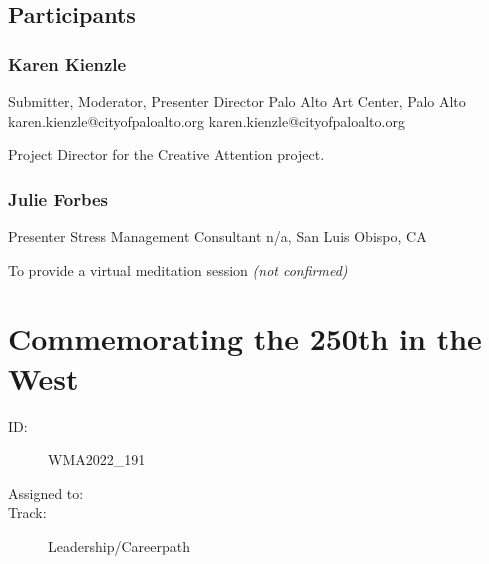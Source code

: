 \documentclass{report}
\begin{document}
            \subsection*{Participants}
              \subsubsection*{ Karen Kienzle }
              Submitter, Moderator, Presenter\newline
              Director\newline
              Palo Alto Art Center, Palo Alto
              \newline
              karen.kienzle@cityofpaloalto.org\newline
              karen.kienzle@cityofpaloalto.org\newline

              Project Director for the Creative Attention project.\newline


              

              
                \subsubsection*{ Julie  Forbes }
                Presenter\newline
                Stress Management Consultant\newline
                n/a, San Luis Obispo, CA
                \newline
                
                
                

                To provide a virtual meditation session
                \emph{ (not confirmed) }
              

              

              

              
        
          \newpage
          \section{ Commemorating the 250th in the West }
            \begin{description}
              \item [ID:]
              WMA2022\_191

              \item [Assigned to:]
                \item [Track:]Leadership/Careerpath~
              \end{description}
\end{document}
